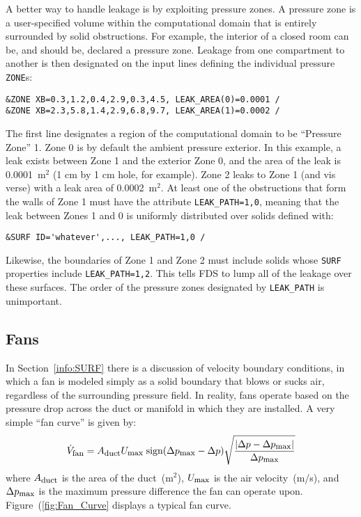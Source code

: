 \documentclass[11pt]{book}
\newcommand{\ct}{\tt\small}
\newcommand{\be}{\begin{equation}}
\newcommand{\ee}{\end{equation}}
\begin{document}
A better way to handle leakage is by exploiting pressure zones. A pressure zone is a user-specified volume within the computational domain that is
entirely surrounded by solid obstructions. For example, the interior of a closed room can be, and should be, declared a pressure zone. Leakage from one
compartment to another is then designated on the input lines defining the individual pressure {\ct ZONE}s:

\footnotesize
\begin{verbatim}
&ZONE XB=0.3,1.2,0.4,2.9,0.3,4.5, LEAK_AREA(0)=0.0001 /
&ZONE XB=2.3,5.8,1.4,2.9,6.8,9.7, LEAK_AREA(1)=0.0002 /
\end{verbatim}
\normalsize

\noindent
The first line designates a region of the computational domain to be ``Pressure Zone'' 1.
Zone 0 is by default the ambient pressure exterior.
In this example, a leak exists between Zone 1 and the exterior Zone 0, and the area of the leak
is 0.0001~m$^2$ (1 cm by 1 cm hole, for example). Zone 2 leaks to Zone 1 (and vis verse)
with a leak area of 0.0002~m$^2$.
At least one of the obstructions that form the walls of Zone 1 must have the attribute
{\ct LEAK\_PATH=1,0}, meaning that the leak between Zones 1 and 0 is uniformly distributed
over solids defined with:

\footnotesize
\begin{verbatim}
&SURF ID='whatever',..., LEAK_PATH=1,0 /
\end{verbatim}
\normalsize

\noindent
Likewise, the boundaries of Zone 1 and Zone 2 must include solids whose {\ct SURF} properties include {\ct LEAK\_PATH=1,2}. This tells FDS to lump all of the
leakage over these surfaces. The order of the pressure zones designated by {\ct LEAK\_PATH} is unimportant.




\subsection{Fans}
\label{info:Fans}

In Section~\ref{info:SURF} there is a discussion of velocity boundary conditions, in which a fan is modeled simply as a solid boundary that blows or
sucks air, regardless of the surrounding pressure field. In reality, fans operate based on the pressure drop across the duct or manifold in which they are
installed. A very simple ``fan curve'' is given by:
\be \dot{V}_{\hbox{\footnotesize fan}} = A_{\hbox{\footnotesize duct}} U_{\hbox{\footnotesize max}} \;
   \hbox{sign} (\Delta p_{\hbox{\footnotesize max}}-\Delta p)
   \sqrt{ \frac{ |\Delta p - \Delta p_{\hbox{\footnotesize max}}|}{\Delta p_{\hbox{\footnotesize max}} } }  \ee
where $A_{\hbox{\footnotesize duct}}$ is the area of the duct~(m$^2$), $U_{\hbox{\footnotesize max}}$ is the air velocity~(m/s), and $\Delta p_{\hbox{\footnotesize max}}$ is the maximum
pressure difference the fan can operate upon. Figure~(\ref{fig:Fan_Curve} displays a typical fan curve.
\end{document}
